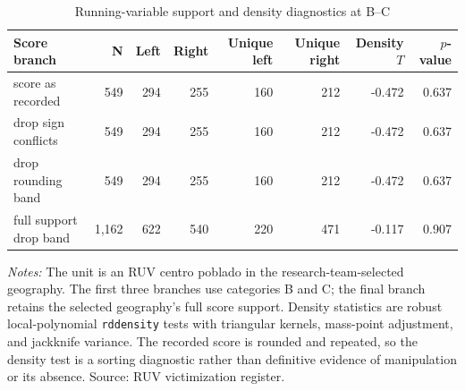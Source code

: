 \begin{table}[!htbp]
\centering
\small
\caption{Running-variable support and density diagnostics at B--C}
\label{tab:rd_validation_support_density}
\begin{tabular}{lrrrrrrr}
\toprule
Score branch & N & Left & Right & Unique left & Unique right & Density \(T\) & \(p\)-value \\
\midrule
score as recorded & 549 & 294 & 255 & 160 & 212 & -0.472 & 0.637 \\
drop sign conflicts & 549 & 294 & 255 & 160 & 212 & -0.472 & 0.637 \\
drop rounding band & 549 & 294 & 255 & 160 & 212 & -0.472 & 0.637 \\
full support drop band & 1,162 & 622 & 540 & 220 & 471 & -0.117 & 0.907 \\
\bottomrule
\end{tabular}
\parbox{0.97\linewidth}{\footnotesize \textit{Notes:} The unit is an RUV centro poblado in the research-team-selected geography. The first three branches use categories B and C; the final branch retains the selected geography's full score support. Density statistics are robust local-polynomial \texttt{rddensity} tests with triangular kernels, mass-point adjustment, and jackknife variance. The recorded score is rounded and repeated, so the density test is a sorting diagnostic rather than definitive evidence of manipulation or its absence. Source: RUV victimization register.}
\end{table}
